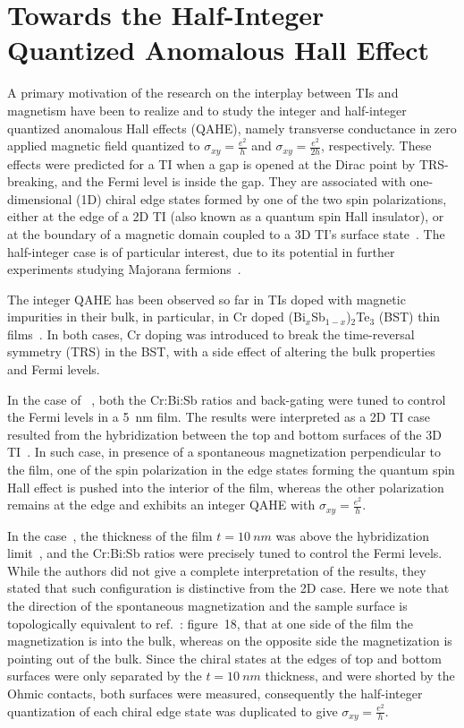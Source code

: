\section{Towards the Half-Integer Quantized Anomalous Hall Effect}
A primary motivation of the research on the interplay between TIs and magnetism have been to realize and to study the integer and half-integer quantized anomalous Hall effects (QAHE), namely transverse conductance in zero applied magnetic field quantized to $\sigma_{xy} = \frac{e^2}{h}$ and $\sigma_{xy} = \frac{e^2}{2h}$, respectively. These effects were predicted for a TI when a gap is opened at the Dirac point by TRS-breaking, and the Fermi level is inside the gap. They are associated with one-dimensional (1D) chiral edge states formed by one of the two spin polarizations, either at the edge of a 2D TI (also known as a quantum spin Hall insulator), or at the boundary of a magnetic domain coupled to a 3D TI's surface state~\cite{TI_Qi, TI_Col, QAH_TI_Yu}. The half-integer case is of particular interest, due to its potential in further experiments studying Majorana fermions~\cite{Akhmerov2009}.

The integer QAHE has been observed so far in TIs doped with magnetic impurities in their bulk, in particular, in Cr doped (Bi$_x$Sb$_{1-x}$)$_2$Te$_3$ (BST) thin films~\cite{Chang2013, Kou2014}. In both cases, Cr doping was introduced to break the time-reversal symmetry (TRS) in the BST, with a side effect of altering the bulk properties and Fermi levels.

In the case of \citeauthor{Chang2013}~\cite{Chang2013}, both the Cr:Bi:Sb ratios and back-gating were tuned to control the Fermi levels in a \SI{5}{nm} film. The results were interpreted as a 2D TI case resulted from the hybridization between the top and bottom surfaces of the 3D TI~\cite{QAH_TI_Yu, 2d_crossover}. In such case, in presence of a spontaneous magnetization perpendicular to the film, one of the spin polarization in the edge states forming the quantum spin Hall effect is pushed into the interior of the film, whereas the other polarization remains at the edge and exhibits an integer QAHE with $\sigma_{xy} = \frac{e^2}{h}$.

In the \citeauthor{Kou2014} case~\cite{Kou2014}, the thickness of the film $t=\SI{10}{nm}$ was above the hybridization limit~\cite{ARPES_thickness}, and the Cr:Bi:Sb ratios were precisely tuned to control the Fermi levels. While the authors did not give a complete interpretation of the results, they stated that such configuration is distinctive from the 2D case. Here we note that the direction of the spontaneous magnetization and the sample surface is topologically equivalent to ref.~\cite{TI_Col}: figure~18, that at one side of the film the magnetization is into the bulk, whereas on the opposite side the magnetization is pointing out of the bulk. Since the chiral states at the edges of top and bottom surfaces were only separated by the $t=\SI{10}{nm}$ thickness, and were shorted by the Ohmic contacts, both surfaces were measured, consequently the half-integer quantization of each chiral edge state was duplicated to give $\sigma_{xy} = \frac{e^2}{h}$.

